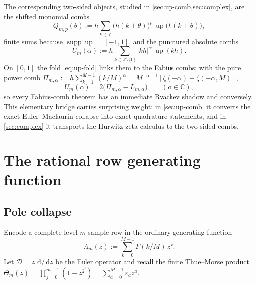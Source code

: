 \documentclass[11pt,oneside]{article}
\numberwithin{equation}{section}
\theoremstyle{definition}
\theoremstyle{remark}
\newcommand{\C}{\mathbb C}
\newcommand{\Z}{\mathbb Z}
\newcommand{\dd}{\,\mathrm d}
\newcommand{\Up}{\operatorname{up}}
\newcommand{\eps}{\varepsilon}
\newcommand{\abs}[1]{\left\lvert #1\right\rvert}
\newcommand{\supp}{\operatorname{supp}}
\newcommand{\Dop}{\mathcal D}
\newcommand{\ThetaTM}{\Theta}
\begin{document}
The corresponding two-sided objects, studied in
\cref{sec:up-comb,sec:complex}, are the shifted monomial combs
\begin{equation}
 Q_{m,p}(\theta)
 :=h\sum_{k\in\Z}\bigl(h(k+\theta)\bigr)^{p}\,
 \Up\bigl(h(k+\theta)\bigr),
 \label{eq:Qmp}
\end{equation}
finite sums because $\supp\Up=[-1,1]$, and the punctured absolute combs
\begin{equation}
 U_m(\alpha)
 :=h\sum_{k\in\Z\setminus\{0\}}\abs{kh}^{\alpha}\,\Up(kh).
 \label{eq:A-alpha-def}
\end{equation}
On $[0,1]$ the fold \eqref{eq:up-fold} links them to the Fabius combs;
with the pure power comb
$\Pi_{m,\alpha}:=h\sum_{k=1}^{M-1}(k/M)^{\alpha}
=M^{-\alpha-1}[\zeta(-\alpha)-\zeta(-\alpha,M)]$,
\begin{equation}
 U_m(\alpha)=2\bigl(\Pi_{m,\alpha}-L_{m,\alpha}\bigr)
 \qquad(\alpha\in\C),
 \label{eq:U-relation}
\end{equation}
so every Fabius-comb theorem has an immediate Rvachev shadow and
conversely.  This elementary bridge carries surprising weight: in
\cref{sec:up-comb} it converts the exact Euler--Maclaurin collapse into
exact quadrature statements, and in \cref{sec:complex} it transports
the Hurwitz-zeta calculus to the two-sided combs.

\section{The rational row generating function}
\label{sec:row}

\subsection{Pole collapse}

Encode a complete level-$m$ sample row in the ordinary generating
function
\begin{equation}
 A_m(z):=\sum_{k=0}^{M-1}F(k/M)\,z^{k}.
 \label{eq:AN}
\end{equation}
Let $\Dop=z\,\dd/\dd z$ be the Euler operator and recall the finite
Thue--Morse product
$\ThetaTM_m(z)=\prod_{j=0}^{m-1}(1-z^{2^{j}})
=\sum_{a=0}^{M-1}\eps_a z^{a}$.
\end{document}
